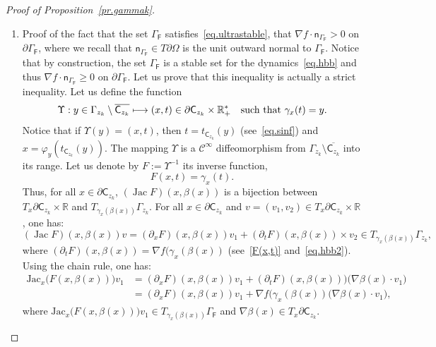 \documentclass[10pt]{amsart}
\newcommand\mto{\mathchoice{\longmapsto}{\mapsto}{\mapsto}{\mapsto}}
\DeclareMathOperator{\Jac}{Jac}
\let\pa\partial
\theoremstyle{plain}
\theoremstyle{definition}
\begin{document}
\begin{proof}[Proof of Proposition~\ref{pr.gammak}]
\begin{enumerate}
\item
Proof of the fact that the set $\Gamma_{\mathsf F}$ satisfies~\eqref{eq.ultrastable}, \ie that
$\nabla f\cdot \mathsf n_{ \Gamma_{\mathsf F} }>0$ on $ \pa \Gamma_{\mathsf F}$,
where we recall that $\mathsf n_{ \Gamma_{\mathsf F}}\in T\partial \Omega$ is the unit outward normal to $ \Gamma_{\mathsf F}$. Notice that by construction, the set $ \Gamma_{\mathsf F}$ is a stable set for the dynamics~\eqref{eq.hbb} and thus $\nabla f\cdot \mathsf n_{ \Gamma_{\mathsf F} }\ge0$ on $ \pa \Gamma_{\mathsf F}$. Let us prove that this inequality is actually a strict inequality. Let us define the function
\[
\Upsilon: y\in \Gamma_{z_k}\setminus \overline{\mathsf C_{z_k}}\mto (x,t)\in \pa \mathsf C_{z_k}\times \mathbb R_+^* \quad\text{such that } \gamma_x(t)=y.
\]
Notice that if $\Upsilon(y)=(x,t)$, then $t=t_{\mathsf C_{z_k}}(y)$
(see~\eqref{eq.sinf}) and $x=\varphi_{y}(t_{\mathsf C_{z_k}}(y))$. The mapping $\Upsilon$ is a $\mathcal C^\infty$ diffeomorphism from $\Gamma_{z_k}\setminus \overline{\mathsf C_{z_k}}$ into its range. Let us denote by $F:=\Upsilon^{-1}$ its inverse function, \ie
\begin{equation}\label{F(x,t)}
F(x,t)=\gamma_x(t).
\end{equation}
Thus, for all $x\in \pa \mathsf C_{z_k}$, $ (\Jac F) (x,\beta(x))$ is a bijection between $T_x\pa \mathsf C_{z_k} \times \mathbb R$ and $ T_{\gamma_x(\beta(x))} \Gamma_{z_k}$. For all $x\in \pa \mathsf C_{z_k}$ and $v = (v_1,v_2)\in T_x\pa \mathsf C_{z_k} \times \mathbb R$, one has:
\begin{equation}\label{jac1}
(\Jac F) (x,\beta(x))v= (\partial_x F)(x,\beta(x)) v_1+ (\partial_t F) (x,\beta(x)) \times v_2 \in T_{\gamma_x(\beta(x))} \Gamma_{z_k},
\end{equation}
where $ (\partial_t F)(x,\beta(x)) = \nabla f(\gamma_x(\beta(x)) $ (see~\eqref{F(x,t)} and~\eqref{eq.hbb2}). Using the chain rule, one has:
\begin{equation}
\label{jac2}
\begin{aligned}
\text{Jac}_x \bigl(F(x,\beta(x))\bigr) v_1&= (\partial_xF)(x,\beta(x)) v_1 + (\partial_t F)(x,\beta(x))) \bigl(\nabla\beta(x) \cdot v_1\bigr)\\
&= (\pa _xF)(x,\beta(x)) v_1 + \nabla f(\gamma_x(\beta(x)) \bigl(\nabla\beta(x) \cdot v_1\bigr),
\end{aligned}
\end{equation}
where $\text{Jac}_x \bigl(F(x,\beta(x))\bigr) v_1\in T_{\gamma_x(\beta(x))} \Gamma_{\mathsf F} $ and $\nabla\beta(x)\in T_x\pa \mathsf C_{z_k}$.

\end{enumerate}
\end{proof}
\end{document}
